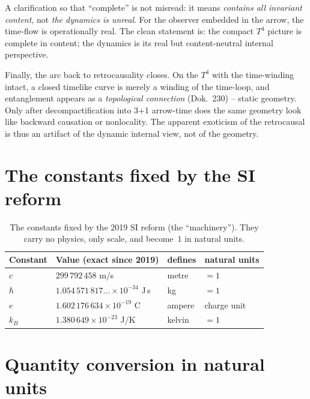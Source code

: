 A clarification so that ``complete'' is not misread: it means \emph{contains all
invariant content}, not \emph{the dynamics is unreal}. For the observer embedded in
the arrow, the time-flow is operationally real. The clean statement is: the
compact $T^4$ picture is complete in content; the dynamics is its real but
content-neutral internal perspective.

Finally, the arc back to retrocausality closes. On the $T^4$ with the time-winding
intact, a closed timelike curve is merely a winding of the time-loop, and
entanglement appears as a \emph{topological connection} (Dok.~230) -- static
geometry. Only after decompactification into 3+1 arrow-time does the same geometry
look like backward causation or nonlocality. The apparent exoticism of the
retrocausal is thus an artifact of the dynamic internal view, not of the geometry.

\section{The constants fixed by the SI reform}

\begin{table}[htbp]
  \centering
  \caption{The constants fixed by the 2019 SI reform (the ``machinery'').
           They carry no physics, only scale, and become~$1$ in natural units.}
  \label{tab:si-fixiert-en}
  \begin{tabular}{llll}
    \toprule
    Constant & Value (exact since 2019) & defines & natural units \\
    \midrule
    $c$     & $299\,792\,458$ m/s                          & metre   & $=1$ \\
    $\hbar$ & $1{.}054\,571\,817\ldots\times10^{-34}$ J\,s & kg      & $=1$ \\
    $e$     & $1{.}602\,176\,634\times10^{-19}$ C           & ampere  & charge unit \\
    $k_B$   & $1{.}380\,649\times10^{-23}$ J/K              & kelvin  & $=1$ \\
    \bottomrule
  \end{tabular}
\end{table}

\section{Quantity conversion in natural units}

